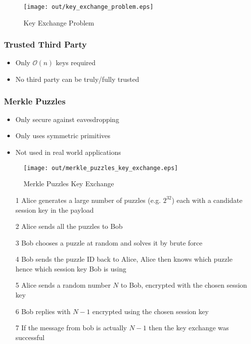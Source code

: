 \documentclass[a4paper]{article}
\begin{document}
\begin{figure}[h!]
  \centering
  \texttt{[image: out/key\_exchange\_problem.eps]}
  \caption{Key Exchange Problem}
  \label{fig:key_exchange_problem}
\end{figure}
\FloatBarrier

\subsubsection{Trusted Third Party}

\begin{itemize}
  \item Only $\mathcal{O}(n)$ keys required
  \item No third party can be truly/fully trusted
\end{itemize}

\subsubsection{Merkle Puzzles}

\begin{itemize}
  \item Only secure against eavesdropping
  \item Only uses symmetric primitives
  \item Not used in real world applications
\end{itemize}

\begin{figure}[h!]
  \centering
  \texttt{[image: out/merkle\_puzzles\_key\_exchange.eps]}
  \caption{Merkle Puzzles Key Exchange}
  \label{fig:merkle_puzzles_key_exchange}
\end{figure}
\FloatBarrier


\begin{enumerate}
  \item[1] Alice generates a large number of puzzles (e.g. $2^{32}$) each with a
           candidate session key in the payload
  \item[2] Alice sends all the puzzles to Bob
  \item[3] Bob chooses a puzzle at random and solves it by brute force
  \item[4] Bob sends the puzzle ID back to Alice, Alice then knows which puzzle
           hence which session key Bob is using
  \item[5] Alice sends a random number $N$ to Bob, encrypted with the
           chosen session key
  \item[6] Bob replies with $N-1$ encrypted using the chosen session key
  \item[7] If the message from bob is actually $N-1$ then the key exchange was
           successful
\end{enumerate}
\end{document}
